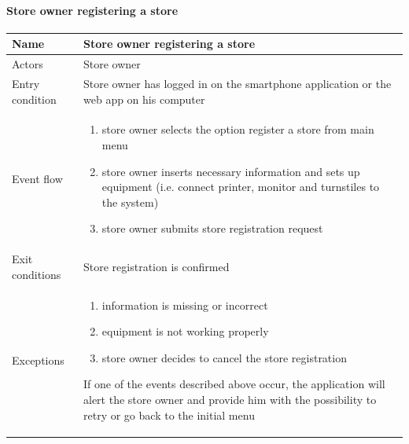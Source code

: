 \paragraph{Store owner registering a store}
\begin{flushleft}
	\begin{tabular} { | m{3cm} | m{10cm} | }
		\hline
		Name & Store owner registering a store\\
		\hline
		Actors & Store owner\\
		\hline
		Entry condition & Store owner has logged in on the smartphone application or the web app on his computer\\
		\hline
		Event flow & \begin{enumerate}
			\item store owner selects the option register a store from main menu
			\item store owner inserts necessary information and sets up equipment (i.e. connect printer, monitor and turnstiles to the system)
			\item store owner submits store registration request
		\end{enumerate}\\
		\hline
		Exit conditions & Store registration is confirmed\\
		\hline
		Exceptions & \begin{enumerate}
			\item information is missing or incorrect
			\item equipment is not working properly			\item store owner decides to cancel the store registration
		\end{enumerate}
		If one of the events described above occur, the application will alert the store owner and provide him with the possibility to retry or go back to the initial menu\\
		\hline
	\end{tabular}
\end{flushleft}
\newpage
